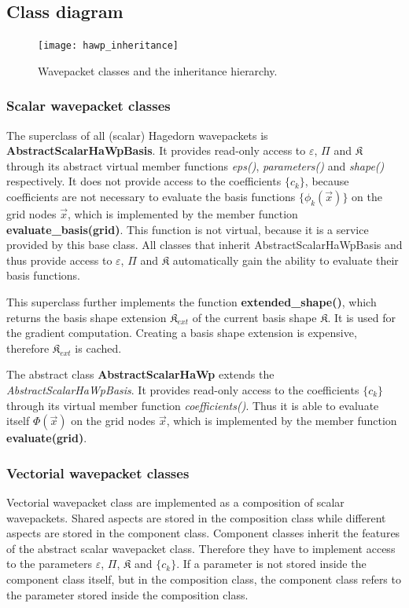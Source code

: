 \documentclass{article}
\def\classname#1{\textit{#1}}
\begin{document}
\subsection{Class diagram}

\begin{figure}[H]
  \centering
  \texttt{[image: hawp\_inheritance]}
  \caption{Wavepacket classes and the inheritance hierarchy.}
  \label{fig:hawp_inheritance}
\end{figure}

\subsubsection{Scalar wavepacket classes}

The superclass of all (scalar) Hagedorn wavepackets is \textbf{AbstractScalarHaWpBasis}.
It provides read-only access to \(\varepsilon\), \(\Pi\) and \(\mathfrak{K}\)
through its abstract virtual member functions \emph{eps()}, \emph{parameters()} and \emph{shape()}
respectively. It does not provide access to the coefficients \(\{c_k\}\), because coefficients
are not necessary to evaluate the basis functions \(\{\phi_k(\vec{x})\}\) on the grid nodes \(\vec{x}\),
which is implemented by the member function \textbf{evaluate\_basis(grid)}.
This function is not virtual, because it is a service provided by this base class.
All classes that inherit AbstractScalarHaWpBasis and thus provide access to \(\varepsilon\),
\(\Pi\) and \(\mathfrak{K}\) automatically gain the ability to evaluate their basis functions.

This superclass further implements the function \textbf{extended\-\_shape()},
which returns the basis shape extension \(\mathfrak{K}_{ext}\)
of the current basis shape \(\mathfrak{K}\). It is used for the gradient computation.
Creating a basis shape extension is expensive, therefore \(\mathfrak{K}_{ext}\) is cached.

The abstract class \textbf{AbstractScalarHaWp} extends the \classname{AbstractScalarHaWpBasis}.
It provides read-only access to the coefficients \(\{c_k\}\) through its virtual member function
\emph{coefficients()}. Thus it is able to evaluate itself \(\Phi(\vec{x})\) on the grid nodes \(\vec{x}\),
which is implemented by the member function \textbf{evaluate(grid)}.

\subsubsection{Vectorial wavepacket classes}
Vectorial wavepacket class are implemented as a composition of scalar wavepackets.
Shared aspects are stored in the composition class while different aspects are
stored in the component class.
Component classes inherit the features of the abstract scalar wavepacket class.
Therefore they have to implement access to the parameters \(\varepsilon\), \(\Pi\), \(\mathfrak{K}\)
and \(\{c_k\}\).
If a parameter is not stored inside the component class itself, but in the composition class,
the component class refers to the parameter stored inside the composition class.
\end{document}
